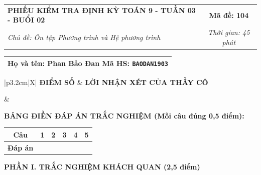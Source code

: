 \documentclass[12pt,a4paper]{article}
\begin{document}
\newpage


\noindent
\begin{tabularx}{\linewidth}{|X|c|}
\hline
\textbf{PHIẾU KIỂM TRA ĐỊNH KỲ TOÁN 9 - TUẦN 03 - BUỔI 02} & \textbf{Mã đề: 104} \\
\textit{Chủ đề: Ôn tập Phương trình và Hệ phương trình} & \textit{Thời gian: 45 phút} \\
\hline
\end{tabularx}

\vspace{1mm}

\noindent
\begin{tabularx}{\linewidth}{|X|}
\hline
\rule[-2mm]{0pt}{7.5mm}\textbf{Họ và tên:} \textbf{\large Phan Bảo Đan} \hfill \textbf{Mã HS:} \texttt{BAODAN1903} \quad \\
\hline
\end{tabularx}

\vspace{1mm}

\noindent
\begin{tabularx}{\linewidth}{|p{3.2cm}|X|}
\hline
\centering\textbf{ĐIỂM SỐ} & \centering\textbf{LỜI NHẬN XÉT CỦA THẦY CÔ} \tabularnewline
\hline
\rule{0pt}{1.3cm} & \tabularnewline
\hline
\end{tabularx}

\vspace{1.2mm}

\noindent\textbf{BẢNG ĐIỀN ĐÁP ÁN TRẮC NGHIỆM (Mỗi câu đúng 0,5 điểm):}
\vspace{0.8mm}

\noindent
\renewcommand{\arraystretch}{1.35}
\begin{tabularx}{\linewidth}{|c|*{5}{>{\centering\arraybackslash}X|}}
\hline
\textbf{Câu} & \textbf{1} & \textbf{2} & \textbf{3} & \textbf{4} & \textbf{5} \\
\hline
\textbf{Đáp án} & & & & & \\
\hline
\end{tabularx}
\renewcommand{\arraystretch}{1.0}

\vspace{1.5mm}

\noindent\textbf{\large PHẦN I. TRẮC NGHIỆM KHÁCH QUAN (2,5 điểm)}
\vspace{1mm}
\end{document}
